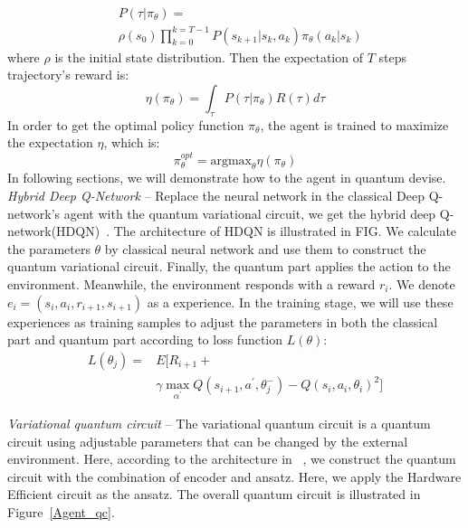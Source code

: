\begin{equation}
    \begin{split}
        &P(\tau|\pi_{\theta})=\\
        &\rho(s_0)\prod_{k=0}^{k=T-1}P(s_{k+1}|s_{k},a_{k})\pi_{\theta}(a_{k}|s_{k})
    \end{split}
\end{equation}
where $\rho$ is the initial state distribution. Then the expectation of $T$ steps trajectory's reward is:
\begin{equation}
    \eta(\pi_{\theta})=\int_{\tau}P(\tau|\pi_{\theta})R(\tau)d\tau
\end{equation}
In order to get the optimal policy function $\pi_{\theta}$, the agent is trained to maximize the expectation $\eta$, which is:
\begin{equation}
    \pi_{\theta}^{opt}=\mathrm{argmax}_{\theta}\eta(\pi_{\theta})
\end{equation}
In following sections, we will demonstrate how to the agent in quantum devise.
\textit{Hybrid Deep Q-Network} -- Replace the neural network in the classical Deep Q-network's agent with the quantum variational circuit, we get the hybrid deep Q-network(HDQN)~\cite{Q_rl}. The architecture of HDQN is illustrated in FIG. We calculate the parameters $\theta$ by classical neural network and use them to construct the quantum variational circuit. Finally, the quantum part applies the action to the environment. Meanwhile, the environment responds with a reward $r_i$. We denote $e_i=(s_i,a_i,r_{i+1},s_{i+1})$ as a experience. In the training stage, we will use these experiences as training samples to adjust the parameters in both the classical part and quantum part according to loss function $L(\theta)$:
\begin{equation}
\begin{split}
    L(\theta_{j})=&E[R_{i+1}+\\
    &\gamma \max_{\alpha^{'}}Q(s_{i+1},a^{'},\theta_{j}^{-})-Q(s_{i},a_{i},\theta_{i})^2]
\end{split}
\label{loss func}
\end{equation}

\textit{Variational quantum circuit} -- The variational quantum circuit is a quantum circuit using adjustable parameters that can be changed by the external environment. Here, according to the architecture in ~\cite{Q_rl}, we construct the quantum circuit with the combination of encoder and ansatz. Here, we apply the Hardware Efficient circuit as the ansatz. The overall quantum circuit is illustrated in Figure~\ref{Agent_qc}.

